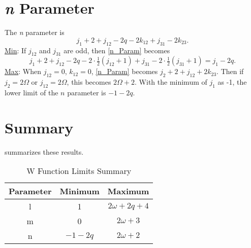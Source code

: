 \documentclass[Dissertation.tex]{subfiles}
\begin{document}
\section{\emph{n} Parameter}
The \emph{n} parameter is
\begin{equation}
	\label{n_Param}j_1 + 2 + j_{12} - 2 q - 2 k_{12} + j_{31} - 2 k_{23}.
\end{equation}
\underline{Min}: If $j_{12}$ and $j_{31}$ are odd, then \cref{n_Param} becomes
	\[j_1 + 2 + j_{12} - 2q - 2\cdot\tfrac{1}{2}(j_{12}+1) + j_{31} - 2\cdot\tfrac{1}{2}(j_{31}+1) = j_1 - 2q.\]
\underline{Max}: When $j_{12} = 0$, $k_{12} = 0$, \cref{n_Param} becomes $j_2 + 2 + j_{12} + 2k_{23}$.  Then if $j_2 = 2\Omega$ or $j_{12} = 2\Omega$, this becomes $2\Omega + 2$.  With the minimum of $j_1$ as -1, the lower limit of the $n$ parameter is $-1 - 2q$.

\section{Summary}
 summarizes these results.

\begin{table}[H]
\centering
\begin{tabular}{c c c}
\toprule
Parameter & Minimum & Maximum \\
\midrule
  l & 1 & $2\omega + 2q + 4$ \\
  m & 0 & $2\omega + 3$ \\
  n	& $-1 - 2q$ & $2\omega + 2$ \\
\bottomrule
\end{tabular}
\caption{W Function Limits Summary}
\label{tab:WLimits}
\end{table}




\biblio
\end{document}

